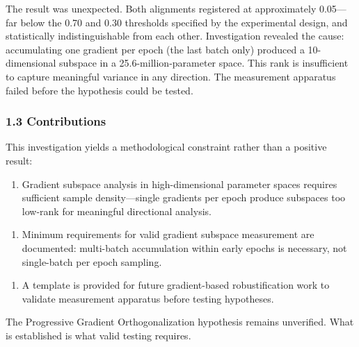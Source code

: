 The result was unexpected. Both alignments registered at approximately 0.05---far below the 0.70 and 0.30 thresholds specified by the experimental design, and statistically indistinguishable from each other. Investigation revealed the cause: accumulating one gradient per epoch (the last batch only) produced a 10-dimensional subspace in a 25.6-million-parameter space. This rank is insufficient to capture meaningful variance in any direction. The measurement apparatus failed before the hypothesis could be tested.

\subsubsection{1.3 Contributions}

This investigation yields a methodological constraint rather than a positive result:

\begin{enumerate}
\item Gradient subspace analysis in high-dimensional parameter spaces requires sufficient sample density---single gradients per epoch produce subspaces too low-rank for meaningful directional analysis.
\end{enumerate}

\begin{enumerate}
\item Minimum requirements for valid gradient subspace measurement are documented: multi-batch accumulation within early epochs is necessary, not single-batch per epoch sampling.
\end{enumerate}

\begin{enumerate}
\item A template is provided for future gradient-based robustification work to validate measurement apparatus before testing hypotheses.
\end{enumerate}

The Progressive Gradient Orthogonalization hypothesis remains unverified. What is established is what valid testing requires.

